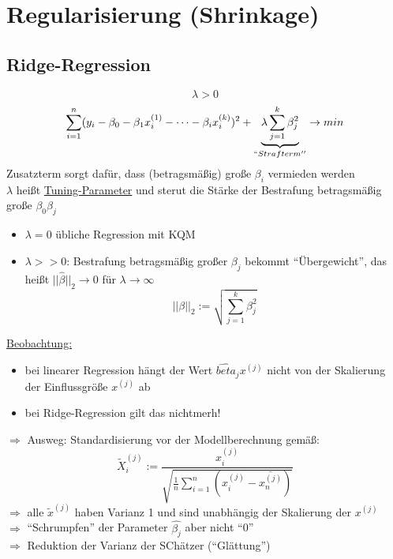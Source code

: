 \documentclass[10pt]{report}
\theoremstyle{definition}
\begin{document}
\section{Regularisierung (Shrinkage)}
\subsection{Ridge-Regression}
\[ \lambda > 0 \]
\[ \sum\limits_{i=1}^{n} (y_i - \beta_0 - \beta_1 x_i^{(1)} - \dots - \beta_i x_i^{(k)})^2 + \underbrace{\lambda \sum\limits_{j=1}^{k} \beta_j^{2}}_{``Strafterm''} \rightarrow min \]
	Zusatzterm sorgt dafür, dass (betragsmäßig) große $\beta_i$ vermieden werden \\
	$\lambda$ heißt \underline{Tuning-Parameter} und sterut die Stärke der Bestrafung betragsmäßig große $\beta_0 \beta_j$
	\begin{itemize}
		\item $\lambda=0$ übliche Regression mit KQM
		\item $\lambda >>0$: Bestrafung betragsmäßig großer $\beta_j$ bekommt ``Übergewicht'', das heißt $||\hat{\beta}||_2 \rightarrow 0 $ für $\lambda \rightarrow \infty $
			\[ ||\beta ||_2 := \sqrt{\sum\limits_{j=1}^{k}\beta_j^{2}} \]
	\end{itemize}
	\underline{Beobachtung:}
	\begin{itemize}
		\item bei linearer Regression hängt der Wert $\hat{beta}_j x^{(j)}$ nicht von der Skalierung der Einflussgröße $x^{(j)}$ ab
		\item bei Ridge-Regression gilt das nichtmerh!
	\end{itemize}
$\Rightarrow$ Ausweg: Standardisierung vor der Modellberechnung gemäß:
\[ \tilde{X}_i^{(j)} := \frac{x_i^{(j)}}{\sqrt{\frac{1}{n}\sum\limits_{i=1}^{n}(x_i^{(j)} - \bar{x^{(j)}_n})}} \]
$\Rightarrow $ alle $\tilde{x}^{(j)}$ haben Varianz 1 und sind unabhängig der Skalierung der $x^{(j)}$ \\
$\Rightarrow$ ``Schrumpfen'' der Parameter $\hat{\beta_j}$ aber nicht ``0'' \\
$\Rightarrow$ Reduktion der Varianz der SChätzer (``Glättung'')
\end{document}
